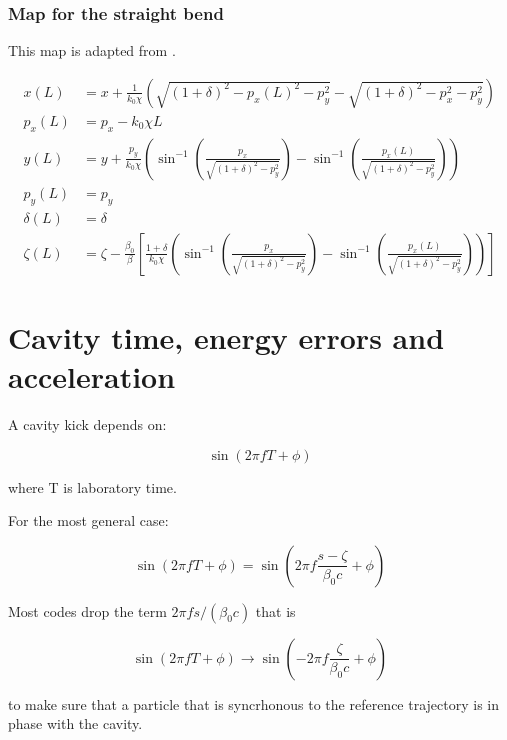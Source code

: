 \subsubsection{Map for the straight bend}

This map is adapted from \cite{forest99}.

\begin{align}
x(L) &= x + \frac{1}{k_0 \chi} \left( \sqrt{(1 + \delta)^2 - p_x(L)^2 - p_y^2} - \sqrt{(1 + \delta)^2 - p_x^2 - p_y^2} \right) \\
p_x(L) &= p_x - k_0 \chi L \\
y(L) &= y + \frac{p_y}{k_0 \chi} \left( \sin^{-1} \left( \frac{p_x}{\sqrt{(1 + \delta)^2 - p_y^2}} \right) - \sin^{-1} \left( \frac{p_x(L)}{\sqrt{(1 + \delta)^2 - p_y^2}} \right) \right) \\
p_y(L) &= p_y \\
\delta(L) &= \delta \\
\zeta(L) &= \zeta - \frac{\beta_0}{\beta}
\left[
\frac{1 + \delta}{k_0 \chi} \left( \sin^{-1} \left( \frac{p_x}{\sqrt{(1 + \delta)^2 - p_y^2}} \right) - \sin^{-1} \left( \frac{p_x(L)}{\sqrt{(1 + \delta)^2 - p_y^2}} \right) \right)
\right]
\end{align}


\section{Cavity time, energy errors and acceleration}

A cavity kick depends on:

\begin{equation}
\sin(2 \pi f T + \phi)
\end{equation}

where T is laboratory time.


For the most general case:

\begin{equation}
\sin(2 \pi f T + \phi) = \sin\left(2 \pi f \frac{s-\zeta}{\beta_0 c}  + \phi \right)
\end{equation}

Most codes drop the term $2 \pi f s / (\beta_0 c)$ that is

\begin{equation}
\sin(2 \pi f T + \phi) \to  \sin\left(- 2 \pi f \frac{\zeta}{\beta_0 c} + \phi\right)
\end{equation}

to make sure that a particle that is syncrhonous to the reference trajectory is in phase with the cavity.



